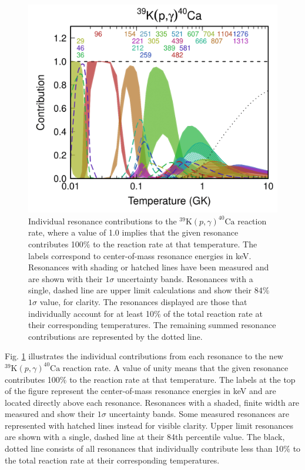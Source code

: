 \begin{figure}[!p]
\includegraphics[width=6.5in]{Chapter-6/figs/Contrib_Fox.png} %
\caption{\label{fig:contrib}Individual resonance contributions to the $^{39}\mathrm{K}(p,\gamma)^{40}\mathrm{Ca}$ reaction rate, where a value of 1.0 implies that the given resonance contributes 100$\%$ to the reaction rate at that temperature. The labels correspond to center-of-mass resonance energies in keV. Resonances with shading or hatched lines have been measured and are shown with their $1\sigma$ uncertainty bands. Resonances with a single, dashed line are upper limit calculations and show their 84$\%$ $1\sigma$ value, for clarity. The resonances displayed are those that individually account for at least 10$\%$ of the total reaction rate at their corresponding temperatures. The remaining summed resonance contributions are represented by the dotted line.}
\end{figure}

Fig. \ref{fig:contrib} illustrates the individual contributions from each resonance to the new $^{39}\mathrm{K}(p,\gamma)^{40}\mathrm{Ca}$ reaction rate. A value of unity means that the given resonance contributes 100$\%$ to the reaction rate at that temperature. The labels at the top of the figure represent the center-of-mass resonance energies in keV and are located directly above each resonance. Resonances with a shaded, finite width are measured and show their $1\sigma$ uncertainty bands. Some measured resonances are represented with hatched lines instead for visible clarity. Upper limit resonances are shown with a single, dashed line at their 84th percentile value. The black, dotted line consists of all resonances that individually contribute less than 10$\%$ to the total reaction rate at their corresponding temperatures.

